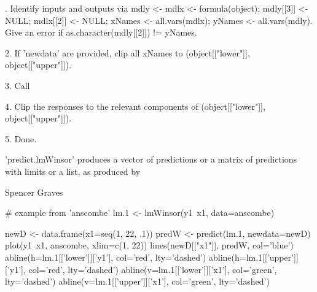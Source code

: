 \begin{Details}.  Identify inputs and outputs via mdly <- mdlx <- formula(object);
mdly[[3]] <- NULL;  mdlx[[2]] <- NULL;  xNames <- all.vars(mdlx);
yNames <- all.vars(mdly).  Give an error if as.character(mdly[[2]]) !=
yNames.  

2.  If 'newdata' are provided, clip all xNames to (object[["lower"]],
object[["upper"]]). 

3.  Call   

4.  Clip the responses to the relevant components of
(object[["lower"]], object[["upper"]]).

5.  Done.
\end{Details}
\begin{Value}
'predict.lmWinsor' produces a vector of predictions or a matrix of
predictions with limits or a list, as produced by
\end{Value}
\begin{Author}\relax
Spencer Graves
\end{Author}
\begin{SeeAlso}\relax
{}
\end{SeeAlso}
\begin{Examples}
\begin{ExampleCode}
# example from 'anscombe' 
lm.1 <- lmWinsor(y1~x1, data=anscombe)

newD <- data.frame(x1=seq(1, 22, .1))
predW <- predict(lm.1, newdata=newD) 
plot(y1~x1, anscombe, xlim=c(1, 22)) 
lines(newD[["x1"]], predW, col='blue')
abline(h=lm.1[['lower']]['y1'], col='red', lty='dashed') 
abline(h=lm.1[['upper']]['y1'], col='red', lty='dashed')
abline(v=lm.1[['lower']]['x1'], col='green', lty='dashed') 
abline(v=lm.1[['upper']]['x1'], col='green', lty='dashed') 

\end{ExampleCode}
\end{Examples}

